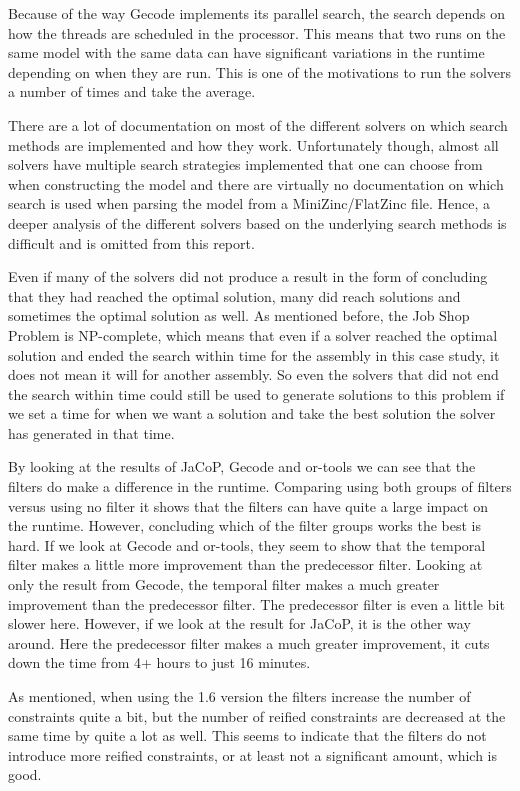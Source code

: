 Because of the way Gecode implements its parallel search, the search depends on how the threads are scheduled in the processor. This means that two runs on the same model with the same data can have significant variations in the runtime depending on when they are run. This is one of the motivations to run the solvers a number of times and take the average.

There are a lot of documentation on most of the different solvers on which search methods are implemented and how they work. Unfortunately though, almost all solvers have multiple search strategies implemented that one can choose from when constructing the model and there are virtually no documentation on which search is used when parsing the model from a MiniZinc/FlatZinc file. Hence, a deeper analysis of the different solvers based on the underlying search methods is difficult and is omitted from this report.

Even if many of the solvers did not produce a result in the form of concluding that they had reached the optimal solution, many did reach solutions and sometimes the optimal solution as well. As mentioned before, the Job Shop Problem is NP-complete, which means that even if a solver reached the optimal solution and ended the search within time for the assembly in this case study, it does not mean it will for another assembly. So even the solvers that did not end the search within time could still be used to generate solutions to this problem if we set a time for when we want a solution and take the best solution the solver has generated in that time.

By looking at the results of JaCoP, Gecode and or-tools we can see that the filters do make a difference in the runtime. Comparing using both groups of filters versus using no filter it shows that the filters can have quite a large impact on the runtime. However, concluding which of the filter groups works the best is hard. If we look at Gecode and or-tools, they seem to show that the temporal filter makes a little more improvement than the predecessor filter. Looking at only the result from Gecode, the temporal filter makes a much greater improvement than the predecessor filter. The predecessor filter is even a little bit slower here. However, if we look at the result for JaCoP, it is the other way around. Here the predecessor filter makes a much greater improvement, it cuts down the time from 4+ hours to just 16 minutes.

As mentioned, when using the 1.6 version the filters increase the number of constraints quite a bit, but the number of reified constraints are decreased at the same time by quite a lot as well. This seems to indicate that the filters do not introduce more reified constraints, or at least not a significant amount, which is good.

